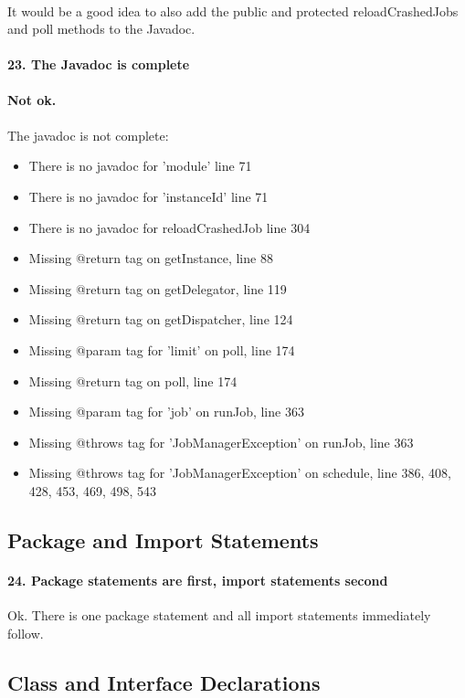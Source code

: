 \documentclass[english]{article}
\begin{document}
\paragraph{}
It would be a good idea to also add the public and protected reloadCrashedJobs and poll  methods to the Javadoc.

\newpage
\paragraph{23. The Javadoc is complete}
\textcolor{cornellred}{\textbf{Not ok.}}
\paragraph{}
The javadoc is not complete:
\begin{itemize}
	\item There is no javadoc for 'module' line 71
	\item There is no javadoc for 'instanceId' line 71
	\item There is no javadoc for reloadCrashedJob line 304
	\item Missing @return tag on getInstance, line 88
	\item Missing @return tag on getDelegator, line 119
	\item Missing @return tag on getDispatcher, line 124
	\item Missing @param tag for 'limit' on poll, line 174
	\item Missing @return tag on poll, line 174
	\item Missing @param tag for 'job' on runJob, line 363
	\item Missing @throws tag for 'JobManagerException' on runJob, line 363
	\item Missing @throws tag for 'JobManagerException' on schedule, line 386, 408, 428, 453, 469, 498, 543
\end{itemize}

\subsection{Package and Import Statements}
\paragraph{24. Package statements are first, import statements second}
Ok.
There is one package statement and all import statements immediately follow.

\subsection{Class and Interface Declarations}
\end{document}

